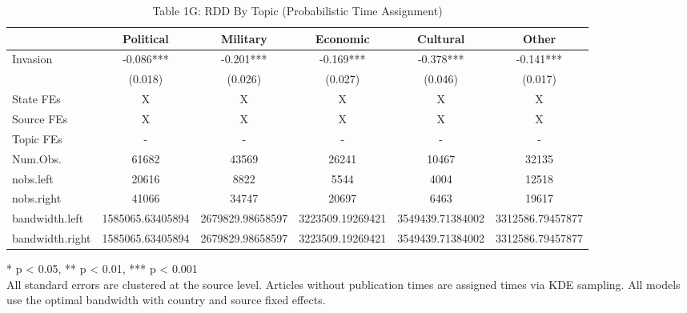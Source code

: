 \begin{table}[!t]
\caption{Table 1G: RDD By Topic (Probabilistic Time Assignment)} 
\fontsize{12.0pt}{14.4pt}\selectfont
\begin{tabular*}{\linewidth}{@{\extracolsep{\fill}}lccccc}
\toprule
  & Political & Military & Economic & Cultural & Other \\ 
\midrule\addlinespace[2.5pt]
Invasion & -0.086*** & -0.201*** & -0.169*** & -0.378*** & -0.141*** \\ 
{} & {(0.018)} & {(0.026)} & {(0.027)} & {(0.046)} & {(0.017)} \\ 
State FEs & X & X & X & X & X \\ 
Source FEs & X & X & X & X & X \\ 
Topic FEs & - & - & - & - & - \\ 
Num.Obs. & 61682 & 43569 & 26241 & 10467 & 32135 \\ 
nobs.left & 20616 & 8822 & 5544 & 4004 & 12518 \\ 
nobs.right & 41066 & 34747 & 20697 & 6463 & 19617 \\ 
bandwidth.left & 1585065.63405894 & 2679829.98658597 & 3223509.19269421 & 3549439.71384002 & 3312586.79457877 \\ 
bandwidth.right & 1585065.63405894 & 2679829.98658597 & 3223509.19269421 & 3549439.71384002 & 3312586.79457877 \\ 
\bottomrule
\end{tabular*}
\begin{minipage}{\linewidth}
* p < 0.05, ** p < 0.01, *** p < 0.001\\
All standard errors are clustered at the source level. Articles without
publication times are assigned times via KDE sampling. All models use the
optimal bandwidth with country and source fixed effects.\\
\end{minipage}
\end{table}

